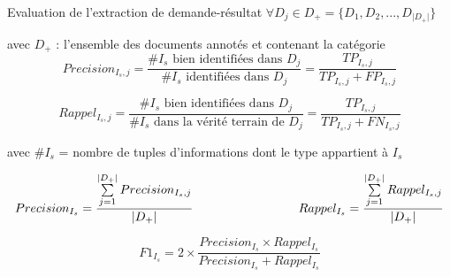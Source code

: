 \documentclass[newPxFont,pagenumber]{beamer}
\begin{document}
\begin{frame}{Evaluation de l'extraction de demande-résultat}
\scriptsize
$\forall D_j \in D_+ = \lbrace D_1, D_2, ..., D_{\vert D_+ \vert} \rbrace$ 

avec $D_+$ : l'ensemble des documents annotés et contenant la catégorie
\[Precision_{I_s,j} = \frac{\# {I_s} \text{ bien identifiées dans } D_j}{\# {I_s} \text{ identifiées dans } D_j}  = \frac{TP_{I_s,j}}{{TP_{I_s,j} + FP_{I_s,j}}} \]

\[Rappel_{I_s,j} = \frac{\# I_s \text{ bien identifiées dans } D_j}{\#  I_s \text{ dans la vérité terrain de } D_j} =  \frac{TP_{I_s,j}}{{TP_{I_s,j} + FN_{I_s,j}}}\]

avec  $\#I_s$ = nombre de tuples d'informations dont le type appartient à $I_s$

\[Precision_{I_s} = \frac{\sum\limits^{\vert D_+ \vert}_{j=1}{Precision_{I_s,j}}}{\vert D_+ \vert} \text{\hspace{3cm}} Rappel_{I_s} = \frac{\sum\limits^{\vert D_+ \vert}_{j=1} Rappel_{I_s,j}}{\vert D_+ \vert}\]

\[F1_{I_s} =2 \times \frac{Precision_{I_s} \times Rappel_{I_s}}{Precision_{I_s} + Rappel_{I_s}}\]
\end{frame}
\end{document}
